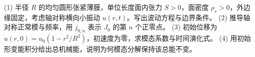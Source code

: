 (1) 半径 \(R\) 的均匀圆形张紧薄膜，单位长度面内张力 \(S>0\)，面密度 \(\rho_s>0\)，外边缘固定，考虑轴对称横向小振动 \(u(r,t)\)。写出波动方程与边界条件。
(2) 推导轴对称正常模与频率，用 \(j_{0,n}\) 表示 \(J_0\) 的第 \(n\) 个正零点。
(3) 初始位移为 \(u(r,0)=u_0(1-r^2/R^2)\)，初速度为零，求模态系数与时间演化式。
(4) 用初始形变能积分给出总机械能，说明为何模态分解保持该总能不变。
